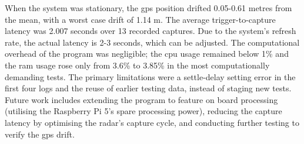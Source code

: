 When the system was stationary, the \gls{gps} position drifted 0.05-0.61 metres from the mean, with a worst case drift of 1.14 m. The average trigger-to-capture latency was 2.007 seconds over 13 recorded captures. Due to the system's refresh rate, the actual latency is 2-3 seconds, which can be adjusted. The computational overhead of the program was negligible; the \gls{cpu} usage remained below 1\% and the \gls{ram} usage rose only from 3.6\% to 3.85\% in the most computationally demanding tests. The primary limitations were a settle-delay setting error in the first four logs and the reuse of earlier testing data, instead of staging new tests. Future work includes extending the program to feature on board processing (utilising the Raspberry Pi 5's spare processing power), reducing the capture latency by optimising the radar's capture cycle, and conducting further testing to verify the \gls{gps} drift. 


